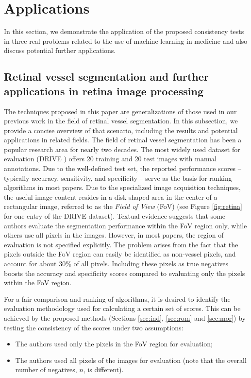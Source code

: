 \documentclass[3p, times]{elsarticle}
\begin{document}
\section{Applications}
\label{sec:applications}

In this section, we demonstrate the application of the proposed consistency tests in three real problems related to the use of machine learning in medicine and also discuss potential further applications.

\subsection{Retinal vessel segmentation and further applications in retina image processing}
\label{sec:retina}

The techniques proposed in this paper are generalizations of those used in our previous work \cite{vessel} in the field of retinal vessel segmentation. In this subsection, we provide a concise overview of that scenario, including the results and potential applications in related fields. 
The field of retinal vessel segmentation has been a popular research area for nearly two decades. The most widely used dataset for evaluation (DRIVE \cite{drive}) offers 20 training and 20 test images with manual annotations. Due to the well-defined test set, the reported performance scores -- typically accuracy, sensitivity, and specificity -- serve as the basis for ranking algorithms in most papers. 
Due to the specialized image acquisition techniques, the useful image content resides in a disk-shaped area in the center of a rectangular image, referred to as the \emph{Field of View} (FoV) (see Figure \ref{fig:retina} for one entry of the DRIVE dataset). Textual evidence suggests that some authors evaluate the segmentation performance within the FoV region only, while others use all pixels in the images. However, in most papers, the region of evaluation is not specified explicitly. The problem arises from the fact that the pixels outside the FoV region can easily be identified as non-vessel pixels, and account for about 30\% of all pixels. Including these pixels as true negatives boosts the accuracy and specificity scores compared to evaluating only the pixels within the FoV region. 

For a fair comparison and ranking of algorithms, it is desired to identify the evaluation methodology used for calculating a certain set of scores. This can be achieved by the proposed methods (Sections \ref{sec:ind}, \ref{sec:rom} and \ref{sec:mor}) by testing the consistency of the scores under two assumptions:
\begin{itemize}
    \item The authors used only the pixels in the FoV region for evaluation;
    \item The authors used all pixels of the images for evaluation (note that the overall number of negatives, $n$, is different). 
\end{itemize}
\end{document}
